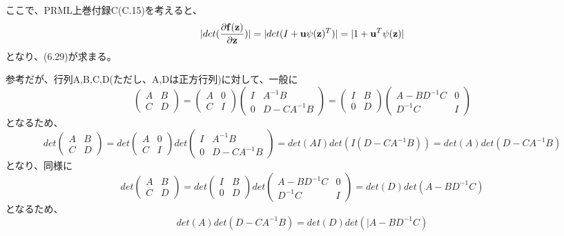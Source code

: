 ﻿\documentclass{jsarticle}
\begin{document}
ここで、PRML上巻付録C(C.15)を考えると、
\begin{equation}
|det (\frac{\partial{\bf f}({\bf z})}{\partial {\bf z}})| = |det(I + {\bf u} \psi({\bf z})^T)|
= |1 + {\bf u}^T \psi({\bf z})|
\end{equation}
となり、(6.29)が求まる。

参考だが、行列A,B,C,D(ただし、A,Dは正方行列)に対して、一般に
\begin{equation}
\begin{pmatrix}
A & B\\
C & D
\end{pmatrix}
=
\begin{pmatrix}
A & 0\\
C & I
\end{pmatrix}
\begin{pmatrix}
I & A^{-1}B\\
0 & D-CA^{-1}B
\end{pmatrix}
=
\begin{pmatrix}
I & B\\
0 & D
\end{pmatrix}
\begin{pmatrix}
A - BD^{-1}C & 0\\
D^{-1}C & I
\end{pmatrix}
\end{equation}
となるため、
\begin{equation}
det \begin{pmatrix}
A & B\\
C & D
\end{pmatrix}
=
det \begin{pmatrix}
A & 0\\
C & I
\end{pmatrix}
det
\begin{pmatrix}
I & A^{-1}B\\
0 & D-CA^{-1}B
\end{pmatrix}
=det(AI)det(I(D-CA^{-1}B))
=det(A)det(D-CA^{-1}B)
\end{equation}
となり、同様に
\begin{equation}det
\begin{pmatrix}
A & B\\
C & D
\end{pmatrix}
=
det \begin{pmatrix}
I & B\\
0 & D
\end{pmatrix}
det
\begin{pmatrix}
A - BD^{-1}C & 0\\
D^{-1}C & I
\end{pmatrix}
=det(D)det(A - BD^{-1}C)
\end{equation}
となるため、
\begin{equation}
det(A)det(D-CA^{-1}B) = det(D)det(|A - BD^{-1}C)
\end{equation}
\end{document}
